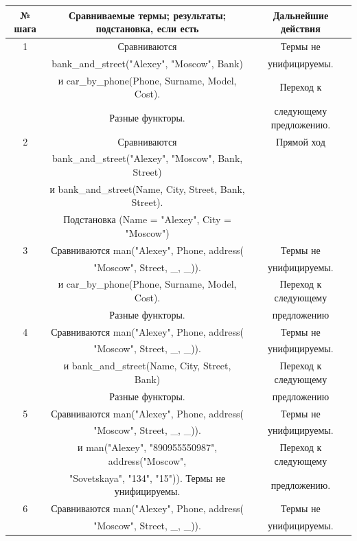 \documentclass[12pt]{report}
\begin{document}
\begin{table}[H]
	\begin{center}
		\begin{tabular}{|c c c |} 
			\hline
			№ шага & Сравниваемые термы; результаты; подстановка, если есть & Дальнейшие действия \\  
			\hline
			1 & Сравниваются & Термы не \\
			  & bank\_and\_street("Alexey"{}, "Moscow"{}, Bank) & унифицируемы. \\
			  & и car\_by\_phone(Phone, Surname, Model, Cost).  & Переход к \\
			  & Разные функторы. & следующему предложению.\\
			\hline
			2 & Сравниваются  & Прямой ход \\
			  & bank\_and\_street("Alexey"{}, "Moscow"{}, Bank, Street) & \\
			  & и bank\_and\_street(Name, City, Street, Bank, Street). & \\
			  & Подстановка (Name = "Alexey"{}, City = "Moscow"{}) &  \\
			\hline
			3 & Сравниваются man("Alexey"{}, Phone, address( & Термы не \\
			  & "Moscow"{}, Street, \_, \_)). & унифицируемы. \\
			  & и car\_by\_phone(Phone, Surname, Model, Cost). & Переход к следующему \\
			  & Разные функторы. & предложению\\
			\hline
			4 & Сравниваются man("Alexey"{}, Phone, address( & Термы не \\
		  	  & "Moscow"{}, Street, \_, \_)). & унифицируемы. \\
			  & и bank\_and\_street(Name, City, Street, Bank) & Переход к следующему \\
			  & Разные функторы. & предложению\\
			\hline
			5 & Сравниваются man("Alexey"{}, Phone, address( & Термы не \\
			  & "Moscow"{}, Street, \_, \_)). & унифицируемы. \\
			  & и man("Alexey"{}, "890955550987"{}, address("Moscow"{}, & Переход к следующему \\
			  & "Sovetskaya"{}, "134"{}, "15"{})). Термы не унифицируемы. & предложению. \\
			\hline
			6 & Сравниваются man("Alexey"{}, Phone, address( & Термы не \\
			  & "Moscow"{}, Street, \_, \_)). & унифицируемы. \\

\end{tabular}
\end{center}
\end{table}
\end{document}
